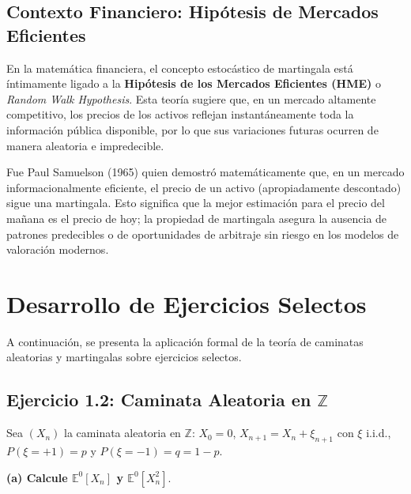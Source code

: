 \documentclass[12pt, a4paper]{article}
\begin{document}
\subsection{Contexto Financiero: Hipótesis de Mercados Eficientes}
En la matemática financiera, el concepto estocástico de martingala está íntimamente ligado a la \textbf{Hipótesis de los Mercados Eficientes (HME)} o \textit{Random Walk Hypothesis}. Esta teoría sugiere que, en un mercado altamente competitivo, los precios de los activos reflejan instantáneamente toda la información pública disponible, por lo que sus variaciones futuras ocurren de manera aleatoria e impredecible. 

Fue Paul Samuelson (1965) quien demostró matemáticamente que, en un mercado informacionalmente eficiente, el precio de un activo (apropiadamente descontado) sigue una martingala. Esto significa que la mejor estimación para el precio del mañana es el precio de hoy; la propiedad de martingala asegura la ausencia de patrones predecibles o de oportunidades de arbitraje sin riesgo en los modelos de valoración modernos.

\vspace{0.5cm}

\section{Desarrollo de Ejercicios Selectos}

A continuación, se presenta la aplicación formal de la teoría de caminatas aleatorias y martingalas sobre ejercicios selectos.

\subsection{Ejercicio 1.2: Caminata Aleatoria en $\mathbb{Z}$}
Sea $(X_n)$ la caminata aleatoria en $\mathbb{Z}$: $X_0 = 0$, $X_{n+1} = X_{n} + \xi_{n+1}$ con $\xi$ i.i.d., $P(\xi=+1)=p$ y $P(\xi=-1)=q=1-p$.

\vspace{0.3cm}
\noindent \textbf{(a) Calcule $\mathbb{E}^0[X_n]$ y $\mathbb{E}^0[X_n^2]$}.
\end{document}

